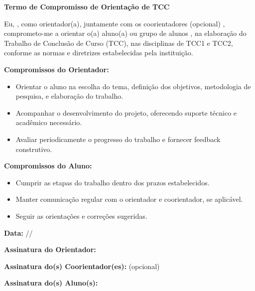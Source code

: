 \documentclass[a4paper, 12pt]{article}
\begin{document}
	\begin{tcolorbox}[title=Termo de Orientação de TCC]
		\textbf{Termo de Compromisso de Orientação de TCC}
		
		Eu, \underline{\hspace{5cm}}, como orientador(a), juntamente com os coorientadores (opcional) \underline{\hspace{5cm}}, comprometo-me a orientar o(a) aluno(a) ou grupo de alunos \underline{\hspace{5cm}}, na elaboração do Trabalho de Conclusão de Curso (TCC), nas disciplinas de TCC1 e TCC2, conforme as normas e diretrizes estabelecidas pela instituição.
		
		\textbf{Compromissos do Orientador:}
		\begin{itemize}
			\item Orientar o aluno na escolha do tema, definição dos objetivos, metodologia de pesquisa, e elaboração do trabalho.
			\item Acompanhar o desenvolvimento do projeto, oferecendo suporte técnico e acadêmico necessário.
			\item Avaliar periodicamente o progresso do trabalho e fornecer feedback construtivo.
		\end{itemize}
		
		\textbf{Compromissos do Aluno:}
		\begin{itemize}
			\item Cumprir as etapas do trabalho dentro dos prazos estabelecidos.
			\item Manter comunicação regular com o orientador e coorientador, se aplicável.
			\item Seguir as orientações e correções sugeridas.
		\end{itemize}
		
		\textbf{Data:} \underline{\hspace{2cm}}/\underline{\hspace{2cm}}/\underline{\hspace{4cm}}
		
		\textbf{Assinatura do Orientador:} \underline{\hspace{6cm}}
		
		\textbf{Assinatura do(s) Coorientador(es):} \underline{\hspace{6cm}} (opcional)
		
		\textbf{Assinatura do(s) Aluno(s):} \underline{\hspace{6cm}}
	\end{tcolorbox}
\end{document}
